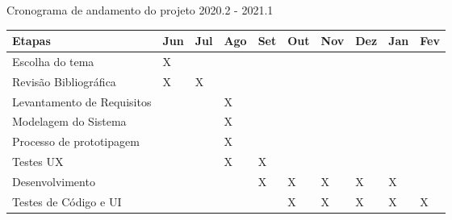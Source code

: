 \begin{quadro}[!htb]
    \centering
    \caption{Cronograma de andamento do projeto 2020.2 - 2021.1
    \label{qua:quadro-exemplo1}}
    \begin{tabular}{|p{3cm}|p{1cm}|p{1cm}|p{1cm}|p{1cm}|p{1cm}|p{1cm}|p{1cm}|p{1cm}|p{1cm}|}
        \hline
        \textbf{Etapas} & \textbf{Jun} & \textbf{Jul} & \textbf{Ago} & \textbf{Set} & \textbf{Out} & \textbf{Nov} & \textbf{Dez} & \textbf{Jan}  & \textbf{Fev}\\
        
        \hline
        Escolha do tema & X &&&&&&&&\\
        \hline
        Revisão Bibliográfica & X & X &&&&&&&\\
        \hline
        Levantamento de Requisitos &&& X &&&&&&\\
        \hline
        Modelagem do Sistema &&& X &&&&&&\\
        \hline
        Processo de prototipagem &&& X &&&&&&\\
        \hline
        Testes UX &&& X & X &&&&&\\
        \hline
        Desenvolvimento &&&& X & X & X & X & X &\\
        \hline
        Testes de Código e UI &&&&& X & X & X & X & X\\
        \hline
    \end{tabular} %
\end{quadro}
